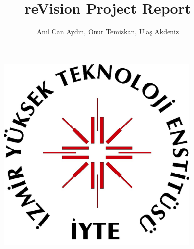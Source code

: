 \documentclass[12pt, a4paper]{article} \pagenumbering{gobble}
\begin{document}
  \author{An{\i}l Can Ayd{\i}n, Onur Temizkan, Ula\c{s} Akdeniz}
  \title{reVision Project Report}
  \maketitle
  \begin{figure}[t]
    \includegraphics[width=10cm,keepaspectratio=true]{iyte}
  \end{figure}
\newpage
\end{document}
